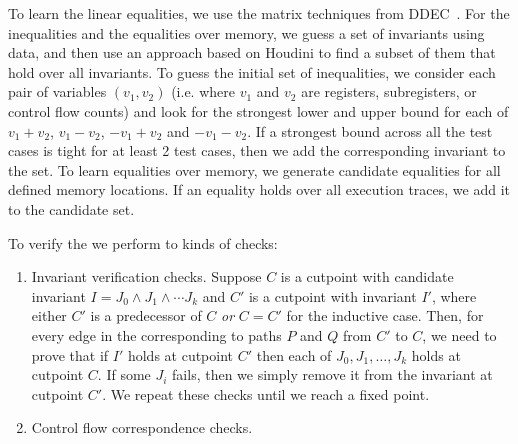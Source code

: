 To learn the linear equalities, we use the matrix techniques from
DDEC~\cite{Sharma2013}. For the inequalities and the equalities over
memory, we guess a set of invariants using data, and then use an
approach based on Houdini to find a subset of them that
hold over all invariants. To guess the initial set of inequalities,
we consider each pair of variables $(v_1, v_2)$ (i.e. where $v_1$ and
$v_2$ are registers, subregisters, or control flow counts) and look
for the strongest lower and upper bound for each of $v_1 + v_2$, $v_1
- v_2$, $-v_1 + v_2$ and $-v_1-v_2$. If a strongest bound across all
the test cases is tight for at least 2 test cases, then we add the
corresponding invariant to the set. To learn equalities over memory,
we generate candidate equalities for all defined memory locations.
If an equality holds over all execution traces, we add it to the
candidate set.

To verify the \bisimrep{} we perform to kinds of checks:

\begin{enumerate}
\item Invariant verification checks. Suppose $C$ is a cutpoint with
candidate invariant $I = J_0 \wedge J_1 \wedge \dotsm J_k$ and $C'$ is
a cutpoint with invariant $I'$, where either $C'$ is a predecessor of
$C$ \emph{or} $C = C'$ for the inductive case. Then, for every edge
in the \bisimrep{} corresponding to paths $P$ and $Q$ from $C'$ to
$C$, we need to prove that if $I'$ holds at cutpoint $C'$ then each of
$J_0,J_1,\dotsc,J_k$ holds at cutpoint $C$. If some $J_i$ fails, then
we simply remove it from the invariant at cutpoint $C'$. We repeat
these checks until we reach a fixed point.
\item Control flow correspondence checks.
\end{enumerate}
